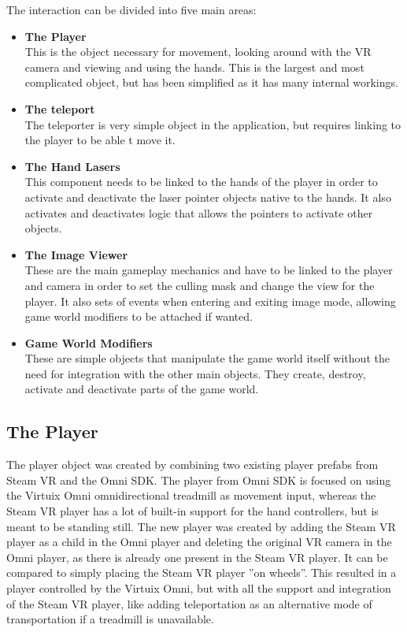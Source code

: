         The interaction can be divided into five main areas:
        
        \begin{itemize}
            \item \textbf{The Player} \\
            This is the object necessary for movement, looking around with the VR camera and viewing and using the hands. This is the largest and most complicated object, but has been simplified as it has many internal workings.
            
            \item \textbf{The teleport} \\
            The teleporter is very simple object in the application, but requires linking to the player to be able t move it.
            
            \item \textbf{The Hand Lasers} \\
            This component needs to be linked to the hands of the player in order to activate and deactivate the laser pointer objects native to the hands. It also activates and deactivates logic that allows the pointers to activate other objects.
            
            \item \textbf{The Image Viewer} \\
            These are the main gameplay mechanics and have to be linked to the player and camera in order to set the culling mask and change the view for the player. It also sets of events when entering and exiting image mode, allowing game world modifiers to be attached if wanted.
            
            \item \textbf{Game World Modifiers} \\
            These are simple objects that manipulate the game world itself without the need for integration with the other main objects. They create, destroy, activate and deactivate parts of the game world.
        \end{itemize}
    
    \subsection{The Player}
        The player object was created by combining two existing player prefabs from Steam VR and the Omni SDK. The player from Omni SDK is focused on using the Virtuix Omni omnidirectional treadmill as movement input, whereas the Steam VR player has a lot of built-in support for the hand controllers, but is meant to be standing still. The new player was created by adding the Steam VR player as a child in the Omni player and deleting the original VR camera in the Omni player, as there is already one present in the Steam VR player. It can be compared to simply placing the Steam VR player ''on wheels''. This resulted in a player controlled by the Virtuix Omni, but with all the support and integration of the Steam VR player, like adding teleportation as an alternative mode of transportation if a treadmill is unavailable.
        
